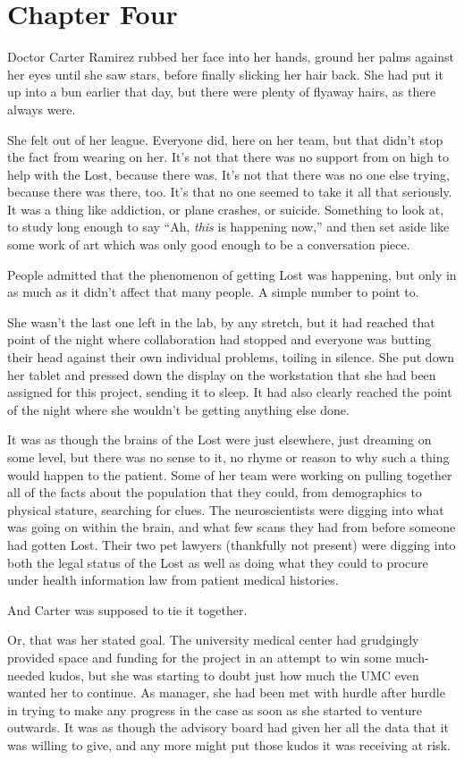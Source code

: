 \chapter*{Chapter Four}

Doctor Carter Ramirez rubbed her face into her hands, ground her palms against her eyes until she saw stars, before finally slicking her hair back.  She had put it up into a bun earlier that day, but there were plenty of flyaway hairs, as there always were.

She felt out of her league.  Everyone did, here on her team, but that didn't stop the fact from wearing on her.  It's not that there was no support from on high to help with the Lost, because there was.  It's not that there was no one else trying, because there was there, too.  It's that no one seemed to take it all that seriously.  It was a thing like addiction, or plane crashes, or suicide.  Something to look at, to study long enough to say ``Ah, \textit{this} is happening now,'' and then set aside like some work of art which was only good enough to be a conversation piece.

People admitted that the phenomenon of getting Lost was happening, but only in as much as it didn't affect that many people.  A simple number to point to.

She wasn't the last one left in the lab, by any stretch, but it had reached that point of the night where collaboration had stopped and everyone was butting their head against their own individual problems, toiling in silence.  She put down her tablet and pressed down the display on the workstation that she had been assigned for this project, sending it to sleep.  It had also clearly reached the point of the night where she wouldn't be getting anything else done.

It was as though the brains of the Lost were just elsewhere, just dreaming on some level, but there was no sense to it, no rhyme or reason to why such a thing would happen to the patient.  Some of her team were working on pulling together all of the facts about the population that they could, from demographics to physical stature, searching for clues.  The neuroscientists were digging into what was going on within the brain, and what few scans they had from before someone had gotten Lost.  Their two pet lawyers (thankfully not present) were digging into both the legal status of the Lost as well as doing what they could to procure under health information law from patient medical histories.

And Carter was supposed to tie it together.

Or, that was her stated goal.  The university medical center had grudgingly provided space and funding for the project in an attempt to win some much-needed kudos, but she was starting to doubt just how much the UMC even wanted her to continue.  As manager, she had been met with hurdle after hurdle in trying to make any progress in the case as soon as she started to venture outwards.  It was as though the advisory board had given her all the data that it was willing to give, and any more might put those kudos it was receiving at risk.
